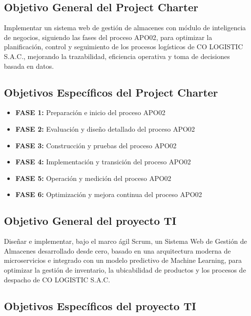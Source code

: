 \documentclass[11pt, a4paper, oneside]{report}
\begin{document}
\subsection{Objetivo General del Project Charter}
Implementar un sistema web de gestión de almacenes con módulo de inteligencia de negocios, siguiendo 	las fases del proceso APO02, para optimizar la planificación, control y seguimiento de los procesos 	logísticos de CO LOGISTIC S.A.C., mejorando la trazabilidad, eficiencia operativa y toma de decisiones 	basada en datos.

\subsection{Objetivos Específicos del Project Charter}

\begin{itemize}

    \item \textbf{FASE 1:}
    Preparación e inicio del proceso APO02

    \item \textbf{FASE 2:}
    Evaluación y diseño detallado del proceso APO02

    \item \textbf{FASE 3:}
    Construcción y pruebas del proceso APO02

    \item \textbf{FASE 4:}
    Implementación y transición del proceso APO02

    \item \textbf{FASE 5:}
    Operación y medición del proceso APO02

    \item \textbf{FASE 6:}
    Optimización y mejora continua del proceso APO02

\end{itemize}

\subsection{Objetivo General del proyecto TI}
Diseñar e implementar, bajo el marco ágil Scrum, un Sistema Web de Gestión de Almacenes desarrollado 	desde cero, basado en una arquitectura moderna de microservicios e integrado con un modelo predictivo de 	Machine Learning, para optimizar la gestión de inventario, la ubicabilidad de productos y los procesos de 	despacho de CO LOGISTIC S.A.C.

\subsection{Objetivos Específicos del proyecto TI}
\end{document}
